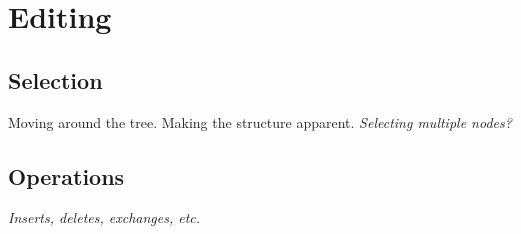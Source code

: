 \section{Editing}
\subsection{Selection}
Moving around the tree. Making the structure apparent. \textit{Selecting multiple nodes?}

\subsection{Operations}
\textit{Inserts, deletes, exchanges, etc.}


